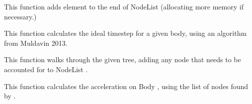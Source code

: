 \documentclass[letterpaper,10pt,english]{sphinxmanual}
\begin{document}
\begin{fulllineitems}
\label{\detokenize{body:c.NodeList_append}}
\end{fulllineitems}


This function adds element  to the end of NodeList  (allocating more memory if necessary.)

\begin{fulllineitems}
\label{\detokenize{body:c.t_ideal}}
\end{fulllineitems}


This function calculates the ideal timestep for a given body, using an algorithm from Muldavin 2013.

\begin{fulllineitems}
\label{\detokenize{body:c.node_finder}}
\end{fulllineitems}


This function walks through the given tree, adding any node that needs to be accounted for to NodeList .

\begin{fulllineitems}
\label{\detokenize{body:c.body_acc}}
\end{fulllineitems}


This function calculates the acceleration on Body , using the list of nodes found by .

\begin{fulllineitems}
\label{\detokenize{body:c.g_acc}}
\end{fulllineitems}
\end{document}
